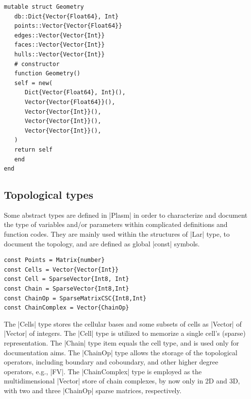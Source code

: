 \begin{lstlisting}[language=JuliaLocal, style=julia, mathescape = true] 
mutable struct Geometry
   db::Dict{Vector{Float64}, Int}
   points::Vector{Vector{Float64}}
   edges::Vector{Vector{Int}}
   faces::Vector{Vector{Int}}
   hulls::Vector{Vector{Int}}
   # constructor
   function Geometry()
   self = new(
      Dict{Vector{Float64}, Int}(),
      Vector{Vector{Float64}}(),
      Vector{Vector{Int}}(),
      Vector{Vector{Int}}(),
      Vector{Vector{Int}}(),
   )
   return self
   end
end
\end{lstlisting}


\subsection*{Topological types}\label{sect:4-1-4}

Some abstract types are defined in |Plasm| in order to characterize and document the type of variables and/or parameters within complicated definitions and function codes. They are mainly used within the structures of |Lar| type, to document the topology, and are defined as global |const| symbols.

\begin{lstlisting}[language=JuliaLocal, style=julia, mathescape = true] 
const Points = Matrix{number}
const Cells = Vector{Vector{Int}}
const Cell = SparseVector{Int8, Int}
const Chain = SparseVector{Int8,Int}
const ChainOp = SparseMatrixCSC{Int8,Int}
const ChainComplex = Vector{ChainOp}
\end{lstlisting}

The |Cells| type stores the cellular bases and some subsets of cells as |Vector| of |Vector| of integers. The |Cell| type is utilized to memorize a single cell's (sparse)  representation. The |Chain| type item equals the cell type, and is used only for documentation aims. The |ChainOp| type allows the storage of the topological operators, including boundary and coboundary, and other higher degree operators, e.g., |FV|. The |ChainComplex| type is employed as the multidimensional |Vector| store of chain complexes, by now only in 2D and 3D, with two and three |ChainOp| sparse matrices, respectively.

